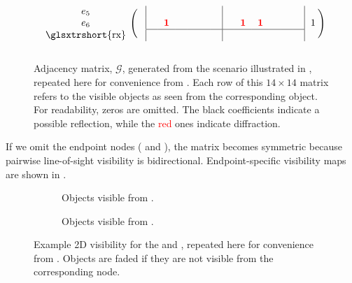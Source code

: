 \begin{figure}[htpb]
\begin{equation*}
\begin{blockarray}{ccccccccccccccc}
\begin{block}{c(>{\medspace}c|cccccc|cccccc|c<{\medspace})}
        e_5 & {} & {} & {} & {} & {} & {} & {} & {} & {} & {} & {} & {} & {} & {}\\ %
        e_6 & {} & {} & \bsit{\color{red}1} & {} & {} & {} & {} & {} & \bsit{\color{red}1} & \bsit{\color{red}1} & {} & {} & {} & 1\\
        \BAhhline{~~------------~}
        \text{\glsxtrshort{rx}} & {} & {} & {} & {} & {} & {} & {} & {} & {} & {} & {} & {} & {} & {}\\
      \end{block}
    \end{blockarray}
  \end{equation*}
  \caption{Adjacency matrix, $\mathcal{G}$, generated from the scenario illustrated in , repeated here for convenience from . Each row of this $14 \times 14$ matrix refers to the visible objects as seen from the corresponding object. For readability, zeros are omitted. The black coefficients indicate a possible reflection, while the \textcolor{red}{red} ones indicate diffraction.}
\end{figure}

If we omit the endpoint nodes ( and ), the matrix becomes symmetric because pairwise \gls{line-of-sight} visibility is bidirectional. Endpoint-specific visibility maps are shown in .

\begin{figure}[htpb]
  \centering
  \begin{subfigure}{0.49\contentwidth}
    \centering
    \caption{Objects visible from .}
  \end{subfigure}
  \begin{subfigure}{0.49\contentwidth}
    \centering
    \caption{Objects visible from .}
  \end{subfigure}
  \caption{Example 2D visibility for the  and , repeated here for convenience from . Objects are faded if they are not visible from the corresponding node.}
\end{figure}

